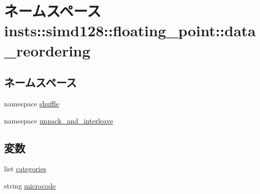 \hypertarget{namespaceinsts_1_1simd128_1_1floating__point_1_1data__reordering}{
\section{ネームスペース insts::simd128::floating\_\-point::data\_\-reordering}
\label{namespaceinsts_1_1simd128_1_1floating__point_1_1data__reordering}
}
\subsection*{ネームスペース}
\begin{DoxyCompactItemize}
\item 
namespace \hyperlink{namespaceinsts_1_1simd128_1_1floating__point_1_1data__reordering_1_1shuffle}{shuffle}
\item 
namespace \hyperlink{namespaceinsts_1_1simd128_1_1floating__point_1_1data__reordering_1_1unpack__and__interleave}{unpack\_\-and\_\-interleave}
\end{DoxyCompactItemize}
\subsection*{変数}
\begin{DoxyCompactItemize}
\item 
list \hyperlink{namespaceinsts_1_1simd128_1_1floating__point_1_1data__reordering_a273cf0f1630af14c1582f05e53354a55}{categories}
\item 
string \hyperlink{namespaceinsts_1_1simd128_1_1floating__point_1_1data__reordering_a770f11a173e99389a8802f0107ed8f52}{microcode}
\end{DoxyCompactItemize}


